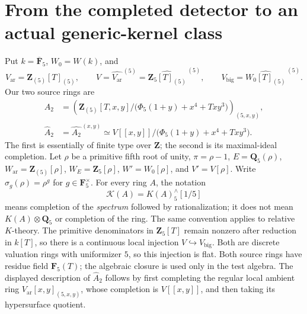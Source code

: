 \documentclass[11pt,a4paper]{article}
\theoremstyle{remark}
\begin{document}



\section{From the completed detector to an actual generic-kernel class}
\label{sec:dimensiontwoactualassembly}

Put $k=\overline{\mathbf F}_5$, $W_0=W(k)$, and
\[
 V_{\mathrm{ar}}=\mathbf Z_{(5)}[T]_{(5)},\qquad
 V=\widehat{V_{\mathrm{ar}}}^{\,(5)}
   =\widehat{\mathbf Z_5[T]_{(5)}}^{\,(5)},\qquad
 V_{\mathrm{big}}=\widehat{W_0[T]_{(5)}}^{\,(5)}.
\]
Our two source rings are
\begin{align}
 A_2&=\left(\mathbf Z_{(5)}[T,x,y]/
       \bigl(\Phi_5(1+y)+x^4+Txy^3\bigr)\right)_{(5,x,y)},
       \label{eq:dimensiontwoArithmeticSource}\\
 \widehat A_2&=\widehat{A_2}^{\,(x,y)}
      \simeq V[[x,y]]/
       \bigl(\Phi_5(1+y)+x^4+Txy^3\bigr).
       \label{eq:dimensiontwoCompletedSource}
\end{align}
The first is essentially of finite type over $\mathbf Z$; the
second is its maximal-ideal completion.
Let $\rho$ be a primitive fifth root of unity,
$\pi=\rho-1$, $E=\mathbf Q_5(\rho)$,
$W_{\mathrm{ar}}=\mathbf Z_{(5)}[\rho]$,
$W_E=\mathbf Z_5[\rho]$, $W'=W_0[\rho]$, and $V'=V[\rho]$.
Write $\sigma_g(\rho)=\rho^g$ for $g\in\mathbf F_5^\times$.
For every ring $A$, the notation
\[
 \mathcal K(A)=K(A)^{\wedge}_5[1/5]
\]
means completion of the \emph{spectrum} followed by rationalization;
it does not mean $K(A)\otimes\mathbf Q_5$ or completion of the ring.
The same convention applies to relative $K$-theory. The primitive
denominators in $\mathbf Z_5[T]$ remain nonzero after reduction in
$k[T]$, so there is a continuous local injection
$V\hookrightarrow V_{\mathrm{big}}$. Both are discrete valuation
rings with uniformizer $5$, so this injection is flat. Both source
rings have residue field $\mathbf F_5(T)$; the algebraic closure
is used only in the test algebra. The displayed description of
$\widehat A_2$ follows by first completing the regular local
ambient ring $V_{\mathrm{ar}}[x,y]_{(5,x,y)}$, whose completion
is $V[[x,y]]$, and then taking its hypersurface quotient.
\end{document}
